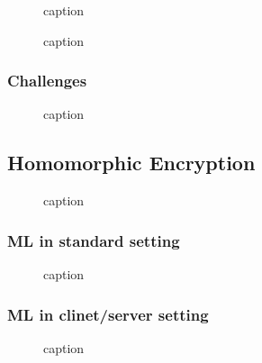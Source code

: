 \documentclass[11pt]{article}
\begin{document}
\begin{figure}[H]
    \centering
    \caption{caption}
\end{figure}

\begin{figure}[H]
    \centering
    \caption{caption}
\end{figure}

\subsubsection{Challenges}

\begin{figure}[H]
    \centering
    \caption{caption}
\end{figure}

\subsection{Homomorphic Encryption}

\begin{figure}[H]
    \centering
    \caption{caption}
\end{figure}

\subsubsection{ML in standard setting}

\begin{figure}[H]
    \centering
    \caption{caption}
\end{figure}

\subsubsection{ML in clinet/server setting}

\begin{figure}[H]
    \centering
    \caption{caption}
\end{figure}
\end{document}
